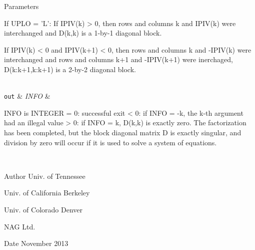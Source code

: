 \begin{DoxyParams}[1]{Parameters}
\begin{DoxyVerb}
          If UPLO = 'L':
             If IPIV(k) > 0, then rows and columns k and IPIV(k)
             were interchanged and D(k,k) is a 1-by-1 diagonal block.

             If IPIV(k) < 0 and IPIV(k+1) < 0, then rows and
             columns k and -IPIV(k) were interchanged and rows and
             columns k+1 and -IPIV(k+1) were inerchaged,
             D(k:k+1,k:k+1) is a 2-by-2 diagonal block.\end{DoxyVerb}
\\
\hline
\mbox{\tt out}  & {\em I\+N\+F\+O} & \begin{DoxyVerb}          INFO is INTEGER
          = 0: successful exit
          < 0: if INFO = -k, the k-th argument had an illegal value
          > 0: if INFO = k, D(k,k) is exactly zero.  The factorization
               has been completed, but the block diagonal matrix D is
               exactly singular, and division by zero will occur if it
               is used to solve a system of equations.\end{DoxyVerb}
 \\
\hline
\end{DoxyParams}
\begin{DoxyAuthor}{Author}
Univ. of Tennessee 

Univ. of California Berkeley 

Univ. of Colorado Denver 

N\+A\+G Ltd. 
\end{DoxyAuthor}
\begin{DoxyDate}{Date}
November 2013 
\end{DoxyDate}
